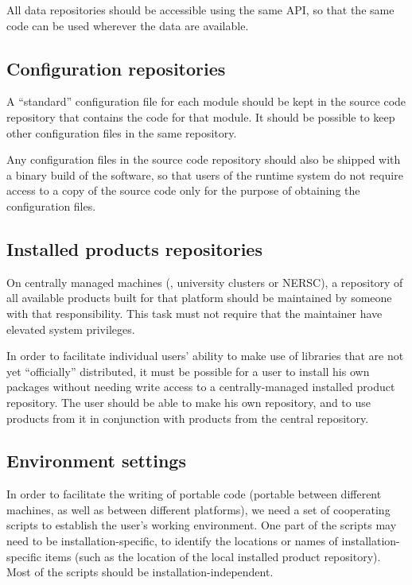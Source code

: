 \documentclass{memarticle}
\begin{document}
All data repositories should be accessible using the same API, so that
the same code can be used wherever the data are available.

\subsection{Configuration repositories}

A ``standard'' configuration file for each module should be kept in the
source code repository that contains the code for that module. It should
be possible to keep other configuration files in the same repository.

Any configuration files in the source code repository should also be
shipped with a binary build of the software, so that users of the
runtime system do not require access to a copy of the source code only
for the purpose of obtaining the configuration files.

\subsection{Installed products repositories}

On centrally managed machines (\eg, university clusters or NERSC), a
repository of all available products built for that platform should be
maintained by someone with that responsibility. This task must not
require that the maintainer have elevated system privileges.

In order to facilitate individual users' ability to make use of
libraries that are not yet ``officially'' distributed, it must be
possible for a user to install his own packages without needing write
access to a centrally-managed installed product repository. The user
should be able to make his own repository, and to use products from it
in conjunction with products from the central repository.

\subsection{Environment settings}

In order to facilitate the writing of portable code (portable between
different machines, as well as between different platforms), we need a
set of cooperating scripts to establish the user's working environment.
One part of the scripts may need to be installation-specific, to
identify the locations or names of installation-specific items (such as
the location of the local installed product repository). Most of the
scripts should be installation-independent.
\end{document}
